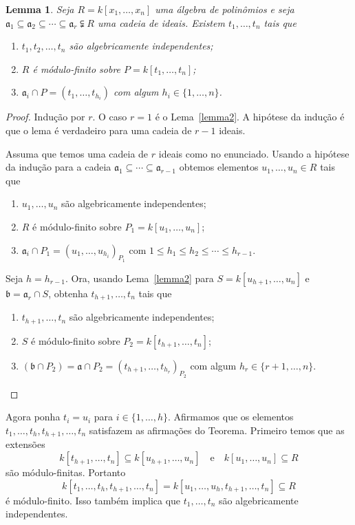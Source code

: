 \documentclass[12pt]{amsart}
\renewcommand{\a}{\mathfrak a}
\renewcommand{\b}{\mathfrak b}
\newtheorem{lemma}[theorem]{Lemma}
\begin{document}
\begin{lemma}\label{lemma3}
    Seja $R=k[x_1,\ldots,x_n]$ uma álgebra de polinômios e seja $\a_1\subseteq \a_2\subseteq \cdots\subseteq \a_r\subsetneqq R$ uma cadeia de ideais. Existem 
    $t_1,\ldots,t_n$ tais que 
    \begin{enumerate}
        \item $t_1,t_2,\ldots,t_n$ são algebricamente independentes;
        \item $R$ é módulo-finito sobre $P=k[t_1,\ldots,t_n]$;
        \item $\a_i\cap P = (t_1,\ldots,t_{h_i})$ com algum $h_i\in\{1,\ldots,n\}$.
    \end{enumerate} 
\end{lemma}
\begin{proof}
    Indução por $r$. O caso $r=1$ é o Lema~\ref{lemma2}. A hipótese da indução é que o lema é verdadeiro para uma cadeia de $r-1$ ideais. 

    Assuma que temos uma cadeia de $r$ ideais como no enunciado. Usando a hipótese da indução para a cadeia $\a_1\subseteq \cdots \subseteq \a_{r-1}$ obtemos 
    elementos $u_1,\ldots,u_n\in R$ tais que 
    \begin{enumerate}
        \item $u_1,\ldots,u_n$ são algebricamente independentes;
        \item $R$ é módulo-finito sobre $P_1=k[u_1,\ldots,u_n]$;
        \item $\a_i\cap P_1=(u_1,\ldots,u_{h_i})_{P_1}$ com $1\leq h_1\leq h_2\leq \cdots\leq  h_{r-1}$.
    \end{enumerate}

    Seja $h=h_{r-1}$. Ora, usando Lema~\ref{lemma2} para $S=k[u_{h+1},\ldots,u_n]$ e $\b=\a_r\cap S$, obtenha $t_{h+1},\ldots,t_n$ tais que 
    \begin{enumerate}
        \item $t_{h+1},\ldots,t_n$ são algebricamente independentes;
        \item $S$ é módulo-finito sobre $P_2=k[t_{h+1},\ldots,t_n]$;
        \item $(\b\cap P_2)= \a\cap P_2=(t_{h+1},\ldots,t_{h_r})_{P_2}$ com algum $h_r\in\{r+1,\ldots,n\}$.
    \end{enumerate}
\end{proof}

Agora ponha $t_i=u_i$ para $i\in\{1,\ldots,h\}$. Afirmamos que os elementos $t_1,\ldots,t_h,t_{h+1},\ldots,t_n$ satisfazem as afirmações do Teorema. Primeiro temos que as extensões 
\[
    k[t_{h+1},\ldots,t_n] \subseteq k[u_{h+1},\ldots,u_n]\quad \mbox{e}\quad k[u_1,\ldots,u_n]\subseteq R
\]
são módulo-finitas. Portanto
\[
    k[t_1,\ldots,t_{h},t_{h+1},\ldots,t_n]= k[u_1,\ldots,u_{h},t_{h+1},\ldots,t_n]\subseteq R
\]
é módulo-finito. Isso também implica que $t_1,\ldots,t_n$ são algebricamente independentes.
\end{document}
